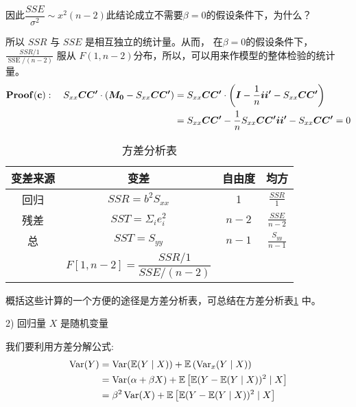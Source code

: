 \begin{myproof}
    因此$\dfrac{S S E}{\sigma^{2}} \sim x^{2}(n-2) $此结论成立不需要$ \beta  = 0 $的假设条件下，为什么？

    
        
    所以 $SSR$ 与 $SSE$ 是相互独立的统计量。从而， 在$ \beta  = 0 $的假设条件下，
     $ \frac{S S R / 1}{\operatorname{SSE} /(n-2)} $ 服从 $F(1,n-2)$分布，所以，可以用来作模型的整体检验的统计量。 
    \begin{align}
        {\bf Proof (c)}: \quad 
        S_{x x} \boldsymbol{ C C^{\prime}} \cdot \left(\boldsymbol{ M_{0}}-S_{x x} \boldsymbol{ C C^{\prime}}\right)  & 
         =  S_{x x} \boldsymbol{ C C^{\prime}} \cdot \left(\boldsymbol{ I} -\frac{1}{n} \boldsymbol{ i i^{\prime}}
         -S_{x x} \boldsymbol{  C C^{\prime} }\right) \notag \\
        & = S_{x x} \boldsymbol{ C C^{\prime}}-\frac{1}{n} S_{x x} \boldsymbol{ C C^{\prime} i i^{\prime}}-S_{x x} \boldsymbol{ C C^{\prime} }= 0 \notag
    \end{align}
 \end{myproof}

 \begin{table}[htb!]
    \centering
    \caption{方差分析表}
    \begin{tabular}{cccc}
        \hline 变差来源 & 变差 & 自由度 & 均方 \\
        \hline 回归 & $S S R=b^{2} S_{x x}$ & 1 & $\frac{S S R}{1}$ \\
        残差 & $S S T=\Sigma_{i} e_{i}^{2}$ & $n-2$ & $\frac{S S E}{n-2}$ \\
        总 & $S S T=S_{y y}$ & $n-1$ & $\frac{S_{y y}}{n-1}$  \vspace{0.5em} \\
         & $F[1, n-2]=\dfrac{S S R / 1}{S S E /(n-2)}$ & \\
        \hline
    \end{tabular}
    \label{tab 4.1}
 \end{table}

 概括这些计算的一个方便的途径是方差分析表，可总结在方差分析表\ref{tab 4.1} 中。

 2) 回归量 $X$ 是随机变量

 我们要利用方差分解公式:
    \begin{align}
        \operatorname{Var}(Y) &=\operatorname{Var}( \mathbb{E}(Y \mid X))+\mathbb{E}\left(\operatorname{Var}_{x}(Y \mid X)\right)  \notag \\
        &=\operatorname{Var}(\alpha+\beta X)+\mathbb{E} \left[\mathbb{E}(Y-\mathbb{E}(Y \mid X))^{2} \mid X\right] \notag  \\
        &=\beta^{2} \operatorname{Var}(X)+\mathbb{E}\left[\mathbb{E}(Y-\mathbb{E}(Y \mid X))^{2} \mid X\right] \notag  
    \end{align}

